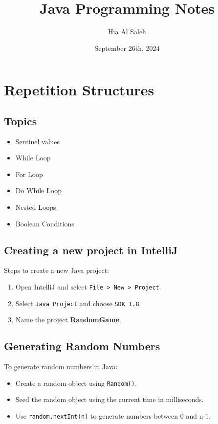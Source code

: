 \documentclass{article}
\title{Java Programming Notes}
\author{Hia Al Saleh}
\date{September 26th, 2024}
\begin{document}
\maketitle
\tableofcontents
\newpage

\section{Repetition Structures}

\subsection{Topics}
\begin{itemize}
    \item  Sentinel values
    \item  While Loop
    \item  For Loop
    \item  Do While Loop
    \item  Nested Loops
    \item  Boolean Conditions
\end{itemize}


\subsection{Creating a new project in IntelliJ}
Steps to create a new Java project:
\begin{enumerate}
    \item Open IntelliJ and select \texttt{File > New > Project}.
    \item Select \texttt{Java Project} and choose \texttt{SDK 1.8}.
    \item Name the project \textbf{RandomGame}.
\end{enumerate}


\subsection{Generating Random Numbers}
To generate random numbers in Java:
\begin{itemize}
    \item Create a random object using \texttt{Random()}.
    \item Seed the random object using the current time in milliseconds.
    \item Use \texttt{random.nextInt(n)} to generate numbers between 0 and n-1.
\end{itemize}
\end{document}
